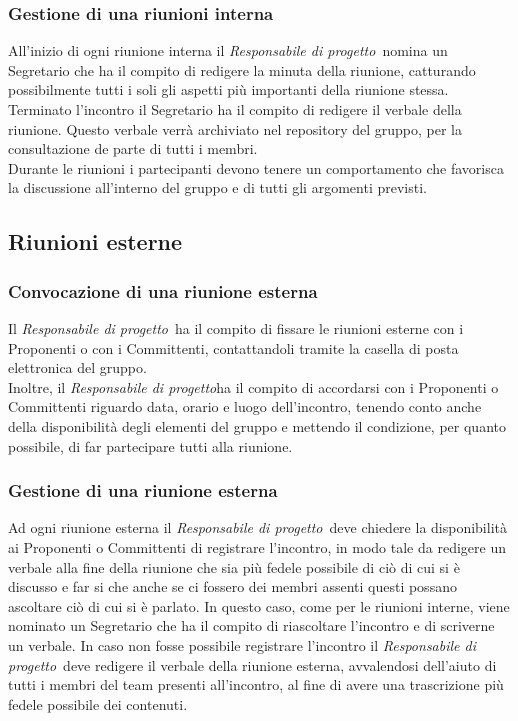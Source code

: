\documentclass[float=false, crop=false]{standalone}
\newcommand{\responsabilediprogetto}{\textit{Responsabile di progetto}}
\begin{document}
		\subsubsection{Gestione di una riunioni interna}
		All'inizio di ogni riunione interna il \responsabilediprogetto\ nomina un Segretario che ha il compito di redigere la minuta della riunione, catturando possibilmente tutti i soli gli aspetti più importanti della riunione stessa. Terminato l'incontro il Segretario ha il compito di redigere il verbale della riunione. Questo verbale verrà archiviato nel repository del gruppo, per la consultazione de parte di tutti i membri. \\ Durante le riunioni i partecipanti devono tenere un comportamento che favorisca la discussione all'interno del gruppo e di tutti gli argomenti previsti. 
		\subsection{Riunioni esterne}
		\subsubsection{Convocazione di una riunione esterna}
		Il \responsabilediprogetto\ ha il compito di fissare le riunioni esterne con i Proponenti o con i Committenti, contattandoli tramite la casella di posta elettronica del gruppo.\\ Inoltre, il \responsabilediprogetto ha il compito di accordarsi con i Proponenti o Committenti riguardo data, orario e luogo dell'incontro, tenendo conto anche della disponibilità degli elementi del gruppo e mettendo il condizione, per quanto possibile, di far partecipare tutti alla riunione.
		\subsubsection{Gestione di una riunione esterna}
		Ad ogni riunione esterna il \responsabilediprogetto\ deve chiedere la disponibilità ai Proponenti o Committenti di registrare l'incontro, in modo tale da redigere un verbale alla fine della riunione che sia più fedele possibile di ciò di cui si è discusso e far si che anche se ci fossero dei membri assenti questi possano ascoltare ciò di cui si è parlato. In questo caso, come per le riunioni interne, viene nominato un Segretario che ha il compito di riascoltare l'incontro e di scriverne un verbale. In caso non fosse possibile registrare l'incontro il \responsabilediprogetto\ deve redigere il verbale della riunione esterna, avvalendosi dell'aiuto di tutti i membri del team presenti all'incontro, al fine di avere una trascrizione più fedele possibile dei contenuti.
\end{document}
